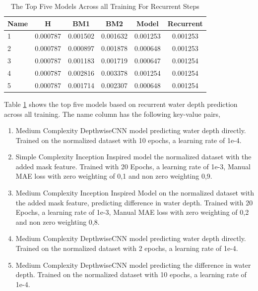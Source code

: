 \begin{table}[htbp]
	\centering
	\caption{The Top Five Models Across all Training For Recurrent Steps}
	\label{tab:best_r}
	\begin{tabular}{p{2cm}ccccc}
		\toprule
		Name &  H &  BM1 &  BM2 &  Model &  Recurrent \\
		\midrule
		1 &       0.000787 &        0.001502 &        0.001632 &   0.001253 &            0.001253 \\
		2 &       0.000787 &        0.000897 &        0.001878 &   0.000648 &            0.001253 \\
		3 &       0.000787 &        0.001183 &        0.001719 &   0.000647 &            0.001254 \\
		4 &       0.000787 &        0.002816 &        0.003378 &   0.001254 &            0.001254 \\
		5 &       0.000787 &        0.001714 &        0.002307 &   0.000648 &            0.001254 \\
		\bottomrule
	\end{tabular}
\end{table}
Table \ref{tab:best_r} shows the top five models based on recurrent water depth prediction across all training. The name column has the following key-value pairs,
\begin{enumerate}
	\item Medium Complexity DepthwiseCNN model predicting water depth directly. Trained on the normalized dataset with 10 epochs, a learning rate of 1e-4. 
	\item Simple Complexity Inception Inspired model the normalized dataset with the added mask feature. Trained with 20 Epochs, a learning rate of 1e-3, Manual MAE loss with zero weighting of 0,1 and non zero weighting 0,9.
	\item Medium Complexity Inception Inspired Model on the normalized dataset with the  added mask feature, predicting difference in water depth. Trained with 20 Epochs, a learning rate of 1e-3, Manual MAE loss with zero weighting of 0,2 and non zero weighting 0,8.
	\item Medium Complexity DepthwiseCNN model predicting water depth directly. Trained on the normalized dataset with 2 epochs, a learning rate of 1e-4.
	\item Medium Complexity DepthwiseCNN model predicting the difference in  water depth. Trained on the normalized dataset with 10 epochs, a learning rate of 1e-4.
\end{enumerate}

